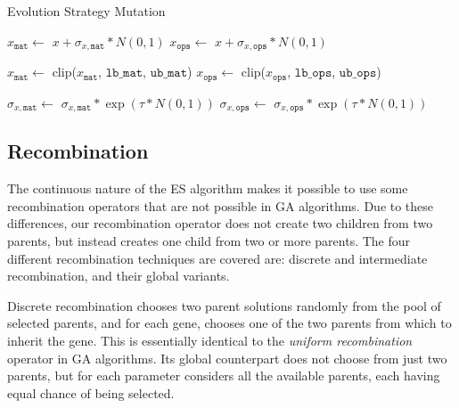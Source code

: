 \documentclass{article}
\begin{document}
\vspace{-0.3cm}
\begin{algorithm}[htbp]

    \caption{Evolution Strategy Mutation}
    \label{alg:ES_mut}
    \SetAlgoLined
    \DontPrintSemicolon


    \BlankLine

    $x_\texttt{mat} \gets$ $x + \sigma_{x, \texttt{mat}} * N(0, 1)$ 
    $x_\texttt{ops} \gets$ $x + \sigma_{x, \texttt{ops}} * N(0, 1)$\;

    \BlankLine
    
    $x_\texttt{mat} \gets$ clip($x_\texttt{mat}$, $\texttt{lb\_mat}$, $\texttt{ub\_mat}$) 
    $x_\texttt{ops} \gets$ clip($x_\texttt{ops}$, $\texttt{lb\_ops}$, $\texttt{ub\_ops}$)\;
    
    \BlankLine

    $\sigma_{x, \texttt{mat}} \gets$ $\sigma_{x, \texttt{mat}} * \exp{({\tau * N(0, 1)})}$ 
    $\sigma_{x, \texttt{ops}} \gets$ $\sigma_{x, \texttt{ops}} * \exp{({\tau * N(0, 1)})}$\;

    \BlankLine


\end{algorithm}

\subsection{Recombination}
\label{sec:ES_rec}

The continuous nature of the ES algorithm makes it possible to use some recombination operators that are not possible in GA algorithms.
Due to these differences, our recombination operator does not create two children from two parents, but instead creates one child from two or more parents.
The four different recombination techniques are covered are: discrete and intermediate recombination, and their global variants.

Discrete recombination chooses two parent solutions randomly from the pool of selected parents, and for each gene, chooses one of the two parents from which to inherit the gene.
This is essentially identical to the \textit{uniform recombination} operator in GA algorithms.
Its global counterpart does not choose from just two parents, but for each parameter considers all the available parents, each having equal chance of being selected.
\end{document}

